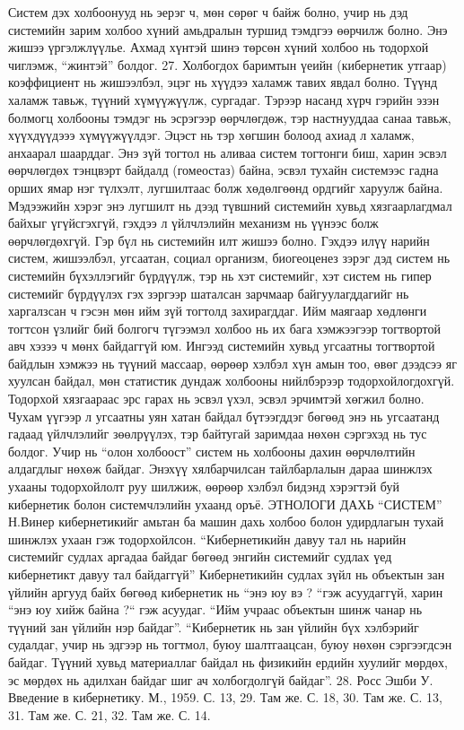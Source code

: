 Систем дэх холбоонууд нь эерэг ч, мөн сөрөг ч байж болно, учир нь дэд системийн зарим холбоо хүний амьдралын туршид тэмдгээ өөрчилж болно. Энэ жишээ үргэлжлүүлье. Ахмад хүнтэй шинэ төрсөн хүний холбоо нь тодорхой чиглэмж, “жинтэй” болдог. 27. Холбогдох баримтын үеийн (кибернетик утгаар) коэффициент нь жишээлбэл, эцэг нь хүүдээ халамж тавих явдал болно.
Түүнд халамж тавьж, түүний хүмүүжүүлж, сургадаг. Тэрээр насанд хүрч гэрийн эзэн болмогц холбооны тэмдэг нь эсрэгээр өөрчлөгдөж, тэр настнууддаа санаа тавьж, хүүхдүүдэээ хүмүүжүүлдэг. Эцэст нь тэр хөгшин болоод ахиад л халамж, анхаарал шаарддаг. Энэ зүй тогтол нь аливаа систем тогтонги биш, харин эсвэл өөрчлөгдөх тэнцвэрт байдалд (гомеостаз) байна, эсвэл тухайн системээс гадна орших ямар нэг түлхэлт, лугшилтаас болж хөдөлгөөнд ордгийг харуулж байна. Мэдээжийн хэрэг энэ лугшилт нь дээд түвшний системийн хувьд хязгаарлагдмал байхыг үгүйсгэхгүй, гэхдээ л үйлчлэлийн механизм нь үүнээс болж өөрчлөгдөхгүй.
Гэр бүл нь системийн илт жишээ болно. Гэхдээ илүү нарийн систем, жишээлбэл, угсаатан, социал организм, биогеоценез зэрэг дэд систем нь системийн бүхэллэгийг бүрдүүлж, тэр нь хэт системийг, хэт систем нь гипер системийг бүрдүүлэх гэх зэргээр шаталсан зарчмаар байгуулагддагийг нь харгалзсан ч гэсэн мөн ийм зүй тогтолд захирагддаг.
Ийм маягаар хөдлөнги тогтсон үзлийг бий болгогч түгээмэл холбоо нь их бага хэмжээгээр тогтвортой авч хэзээ ч мөнх байдаггүй юм.
Ингээд системийн хувьд угсаатны тогтвортой байдлын хэмжээ нь түүний массаар, өөрөөр хэлбэл хүн амын тоо, өвөг дээдсээ яг хуулсан байдал, мөн статистик дундаж холбооны нийлбэрээр тодорхойлогдохгүй. Тодорхой хязгаараас эрс гарах нь эсвэл үхэл, эсвэл эрчимтэй хөгжил болно. Чухам үүгээр л угсаатны уян хатан байдал бүтээгддэг бөгөөд энэ нь угсаатанд гадаад үйлчлэлийг зөөлрүүлэх, тэр байтугай заримдаа нөхөн сэргэхэд нь тус болдог. Учир нь “олон холбоост” систем нь холбооны дахин өөрчлөлтийн алдагдлыг нөхөж байдаг.
Энэхүү хялбарчилсан тайлбарлалын дараа шинжлэх ухааны тодорхойлолт руу шилжиж, өөрөөр хэлбэл бидэнд хэрэгтэй буй кибернетик болон системчлэлийн ухаанд оръё.
ЭТНОЛОГИ ДАХЬ “СИСТЕМ”
Н.Винер кибернетикийг амьтан ба машин дахь холбоо болон удирдлагын тухай шинжлэх ухаан гэж тодорхойлсон. “Кибернетикийн давуу тал нь нарийн системийг судлах аргадаа байдаг бөгөөд энгийн системийг судлах үед кибернетикт давуу тал байдаггүй” Кибернетикийн судлах зүйл нь объектын зан үйлийн аргууд байх бөгөөд кибернетик нь “энэ юу вэ ? “гэж асуудаггүй, харин “энэ юу хийж байна ?“ гэж асуудаг. “Ийм учраас объектын шинж чанар нь түүний зан үйлийн нэр байдаг”. “Кибернетик нь зан үйлийн бүх хэлбэрийг судалдаг, учир нь эдгээр нь тогтмол, буюу шалтгаацсан, буюу нөхөн сэргээгдсэн байдаг. Түүний хувьд материаллаг байдал нь физикийн ердийн хуулийг мөрдөх, эс мөрдөх нь адилхан байдаг шиг ач холбогдолгүй байдаг”. 28. Росс Эшби У. Введение в кибернетику. М., 1959. С. 13, 29. Там же. С. 18, 30. Там же. С. 13, 31. Там же. С. 21, 32. Там же. С. 14.
